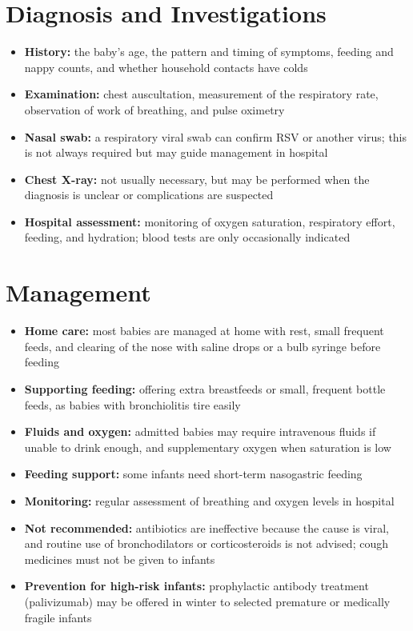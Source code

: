 \section*{Diagnosis and Investigations}
\begin{itemize}
    \item \textbf{History:} the baby's age, the pattern and timing of symptoms, feeding and nappy counts, and whether household contacts have colds
    \item \textbf{Examination:} chest auscultation, measurement of the respiratory rate, observation of work of breathing, and pulse oximetry
    \item \textbf{Nasal swab:} a respiratory viral swab can confirm RSV or another virus; this is not always required but may guide management in hospital
    \item \textbf{Chest X-ray:} not usually necessary, but may be performed when the diagnosis is unclear or complications are suspected
    \item \textbf{Hospital assessment:} monitoring of oxygen saturation, respiratory effort, feeding, and hydration; blood tests are only occasionally indicated
\end{itemize}

\section*{Management}
\begin{itemize}
    \item \textbf{Home care:} most babies are managed at home with rest, small frequent feeds, and clearing of the nose with saline drops or a bulb syringe before feeding
    \item \textbf{Supporting feeding:} offering extra breastfeeds or small, frequent bottle feeds, as babies with bronchiolitis tire easily
    \item \textbf{Fluids and oxygen:} admitted babies may require intravenous fluids if unable to drink enough, and supplementary oxygen when saturation is low
    \item \textbf{Feeding support:} some infants need short-term nasogastric feeding
    \item \textbf{Monitoring:} regular assessment of breathing and oxygen levels in hospital
    \item \textbf{Not recommended:} antibiotics are ineffective because the cause is viral, and routine use of bronchodilators or corticosteroids is not advised; cough medicines must not be given to infants
    \item \textbf{Prevention for high-risk infants:} prophylactic antibody treatment (palivizumab) may be offered in winter to selected premature or medically fragile infants
\end{itemize}

